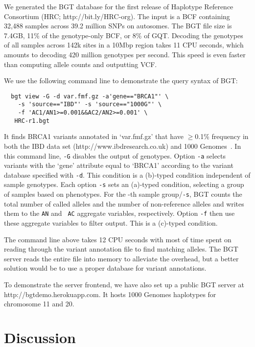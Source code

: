 \documentclass{bioinfo}
\begin{document}
We generated the BGT database for the first release of Haplotype Reference
Consortium (HRC; http://bit.ly/HRC-org). The input is a BCF containing 32,488
samples across 39.2 million SNPs on autosomes. The BGT file size is 7.4GB, 11\%
of the genotype-only BCF, or 8\% of GQT. Decoding the genotypes of all samples
across 142k sites in a 10Mbp region takes 11 CPU seconds, which amounts to
decoding 420 million genotypes per second. This speed is even faster than
computing allele counts and outputting VCF.

We use the following command line to demonstrate the query syntax of BGT:
\begin{center}\footnotesize
\begin{verbatim}
  bgt view -G -d var.fmf.gz -a'gene=="BRCA1"' \
    -s 'source=="IBD"' -s 'source=="1000G"' \
    -f 'AC1/AN1>=0.001&&AC2/AN2>=0.001' \
   HRC-r1.bgt
\end{verbatim}
\end{center}
It finds BRCA1 variants annotated in `var.fmf.gz' that have $\ge$0.1\%
frequency in both the IBD data set (http://www.ibdresearch.co.uk) and
1000 Genomes~\citep{1000-Genomes-Project-Consortium:2012aa}. In this command line, {\tt -G} disables the output of genotypes.
Option {\tt -a} selects variants with the `gene' attribute equal to `BRCA1'
according to the variant database specified with {\tt -d}. This condition
is a (b)-typed condition independent of sample genotypes. Each option {\tt -s} sets an (a)-typed condition, selecting a group of
samples based on phenotypes.  For the -th sample
group/{\tt -s}, BGT counts the total number of called alleles and the number of
non-reference alleles and writes them to the {\tt AN\char35} and {\tt
AC\char35} aggregate variables, respectively. Option {\tt -f} then use these
aggregate variables to filter output. This is a (c)-typed condition.

The command line above takes 12 CPU seconds with most of time spent on reading
through the variant annotation file to find matching alleles. The BGT server
reads the entire file into memory to alleviate the overhead, but a better
solution would be to use a proper database for variant annotations.

To demonstrate the server frontend, we have also set up a public BGT server at
http://bgtdemo.herokuapp.com. It hosts 1000 Genomes haplotypes for chromosome 11 and
20.

\section{Discussion}
\end{document}
